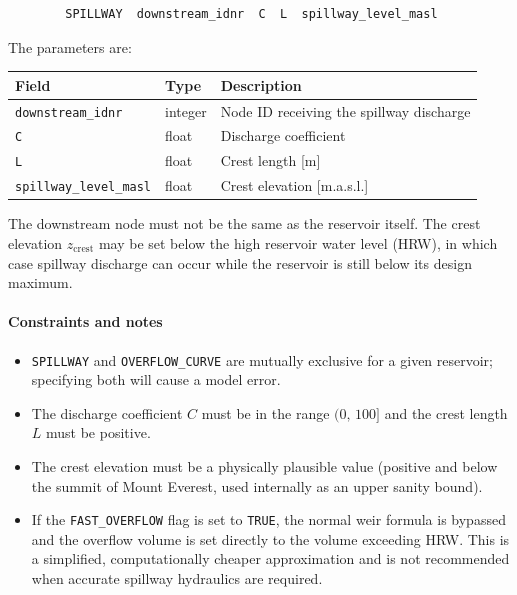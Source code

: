 \documentclass[a4paper, 12pt]{report}
\begin{document}
	\begin{verbatim}
		SPILLWAY  downstream_idnr  C  L  spillway_level_masl
	\end{verbatim}

	\noindent The parameters are:
	\begin{center}
		\begin{tabular}{lll}
			\hline
			Field & Type & Description \\
			\hline
			\texttt{downstream\_idnr}      & integer & Node ID receiving the spillway discharge \\
			\texttt{C}                     & float   & Discharge coefficient \\
			\texttt{L}                     & float   & Crest length [m] \\
			\texttt{spillway\_level\_masl} & float   & Crest elevation [m.a.s.l.] \\
			\hline
		\end{tabular}
	\end{center}

	The downstream node must not be the same as the reservoir itself. The crest elevation $z_\text{crest}$ may be set below the high reservoir water level (HRW), in which case spillway discharge can occur while the reservoir is still below its design maximum.

	\paragraph{Constraints and notes}

	\begin{itemize}
	\item \texttt{SPILLWAY} and \texttt{OVERFLOW\_CURVE} are mutually exclusive for a given reservoir; specifying both will cause a model error.
	\item The discharge coefficient $C$ must be in the range $(0,\,100]$ and the crest length $L$ must be positive.
	\item The crest elevation must be a physically plausible value (positive and below the summit of Mount Everest, used internally as an upper sanity bound).
	\item If the \texttt{FAST\_OVERFLOW} flag is set to \texttt{TRUE}, the normal weir formula is bypassed and the overflow volume is set directly to the volume exceeding HRW. This is a simplified, computationally cheaper approximation and is not recommended when accurate spillway hydraulics are required.
	\end{itemize}
\end{document}
